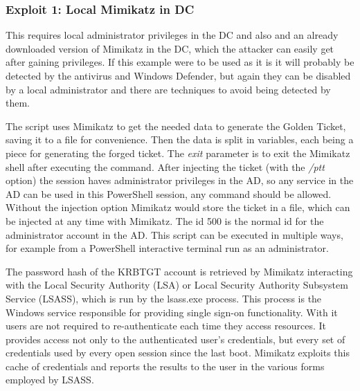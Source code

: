 \subsubsection{Exploit 1: Local Mimikatz in DC}
This requires local administrator privileges in the DC and also and an already downloaded version of Mimikatz in the DC, which the attacker can easily get after gaining privileges. If this example were to be used as it is it will probably be detected by the antivirus and Windows Defender, but again they can be disabled by a local administrator and there are techniques to avoid being detected by them.
\linej

\linej
The script uses Mimikatz to get the needed data to generate the Golden Ticket, saving it to a file for convenience. Then the data is split in variables, each being a piece for generating the forged ticket. The \textit{exit} parameter is to exit the Mimikatz shell after executing the command.
\linej
After injecting the ticket (with the \textit{/ptt} option) the session haves administrator privileges in the AD, so any service in the AD can be used in this PowerShell session, any command should be allowed. Without the injection option Mimikatz would store the ticket in a file, which can be injected at any time with Mimikatz.
The id 500 is the normal id for the administrator account in the AD.
This script can be executed in multiple ways, for example from a PowerShell interactive terminal run as an administrator.
\linej

\linej
The password hash of the KRBTGT account is retrieved by Mimikatz interacting with the Local Security Authority (LSA) or Local Security Authority Subsystem Service (LSASS), which is run by the lsass.exe process.
\linej
This process is the Windows service responsible for providing single sign-on functionality.
With it users are not required to re-authenticate each time they access resources.
It provides access not only to the authenticated user's credentials, but every set of credentials used by every open session since the last boot\cite{wikipedia_lsass}\cite{dump_ways}.
\linej
Mimikatz exploits this cache of credentials and reports the results to the user in the various forms employed by LSASS\cite{SANS_mimikatz}\cite{pentestlab}.

